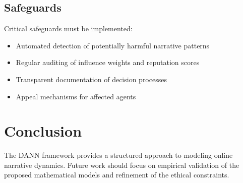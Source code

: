 \documentclass[12pt, a4paper]{article}
\begin{document}
\subsection{Safeguards}
Critical safeguards must be implemented:
\begin{itemize}
\item Automated detection of potentially harmful narrative patterns
\item Regular auditing of influence weights and reputation scores
\item Transparent documentation of decision processes
\item Appeal mechanisms for affected agents
\end{itemize}

\section{Conclusion}
The DANN framework provides a structured approach to modeling online narrative dynamics. Future work should focus on empirical validation of the proposed mathematical models and refinement of the ethical constraints.


\begin{thebibliography}{9}
\end{thebibliography}
\end{document}
